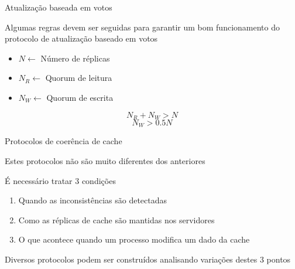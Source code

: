 \documentclass[compress]{beamer}
\begin{document}
\begin{frame}{Atualização baseada em votos}

Algumas regras devem ser seguidas para garantir um bom funcionamento do protocolo de atualização baseado em votos

\vspace{1cm}

\begin{minipage}{.55\textwidth}
\begin{itemize}
    \item $N \leftarrow$ Número de réplicas
    \item $N_R \leftarrow$ Quorum de leitura
    \item $N_W \leftarrow$ Quorum de escrita
\end{itemize}
\end{minipage}%
\begin{minipage}{.44\textwidth}
$$
N_R + N_W > N
$$
$$
N_W > 0.5 N
$$
\end{minipage}

\end{frame}


\begin{frame}{Protocolos de coerência de cache}

Estes protocolos não são muito diferentes dos anteriores

\vspace{0.5cm}

É necessário tratar 3 condições
\begin{enumerate}
    \item Quando as inconsistências são detectadas
    \item Como as réplicas de cache são mantidas nos servidores
    \item O que acontece quando um processo modifica um dado da cache
\end{enumerate}

\vspace{0.5cm}

Diversos protocolos podem ser construídos analisando variações destes 3 pontos

\end{frame}

\end{document}
